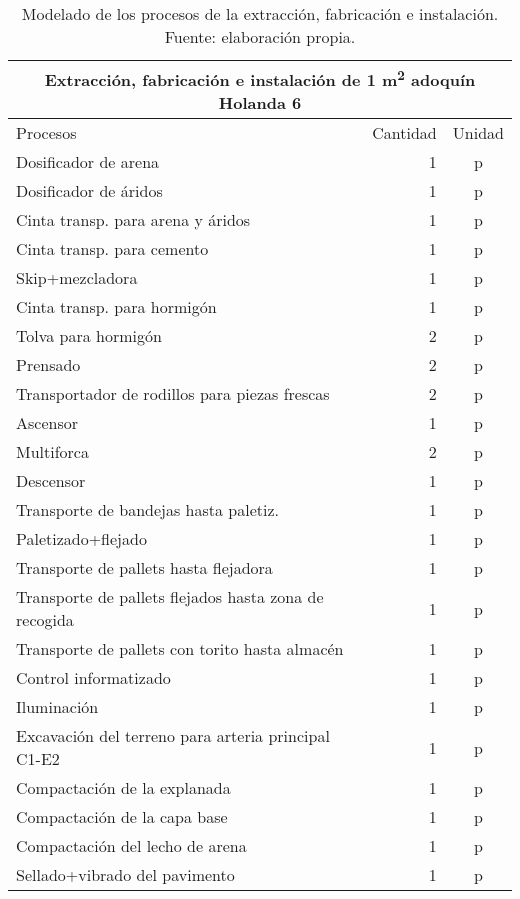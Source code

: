 \begin{table}[!htp]
\centering
\begin{tabular}{p{8cm}rc}
\toprule
\multicolumn{3}{c}{Extracción, fabricación e instalación de 1 \si{m^2} adoquín Holanda 6}\\
\midrule
Procesos & Cantidad & Unidad\\
\midrule
Dosificador de arena & 1 & p\\
Dosificador de áridos & 1 & p\\
Cinta transp. para arena y áridos & 1 & p\\
Cinta transp. para cemento & 1 & p\\
Skip+mezcladora & 1 & p\\
Cinta transp. para hormigón & 1 & p\\
Tolva para hormigón & 2 & p\\
Prensado & 2 & p\\
Transportador de rodillos para piezas frescas & 2 & p\\
Ascensor & 1 & p\\
Multiforca & 2 & p\\
Descensor & 1 & p\\
Transporte de bandejas hasta paletiz. & 1 & p\\
Paletizado+flejado & 1 & p\\
Transporte de pallets hasta flejadora & 1 & p\\
Transporte de pallets flejados hasta zona de recogida & 1 & p\\
Transporte de pallets con torito hasta almacén & 1 & p\\
Control informatizado & 1 & p\\
Iluminación & 1 & p\\
Excavación del terreno para arteria principal C1-E2 & 1 & p\\
Compactación de la explanada & 1 & p\\
Compactación de la capa base & 1 & p\\
Compactación del lecho de arena & 1 & p\\
Sellado+vibrado del pavimento & 1 & p\\
\bottomrule
\end{tabular}
\caption[Modelado de los procesos de la extracción, fabricación e instalación.]{Modelado de los procesos de la extracción, fabricación e instalación. Fuente: elaboración propia.}
\label{modeladocompletofabricacionprocesos}
\end{table}

